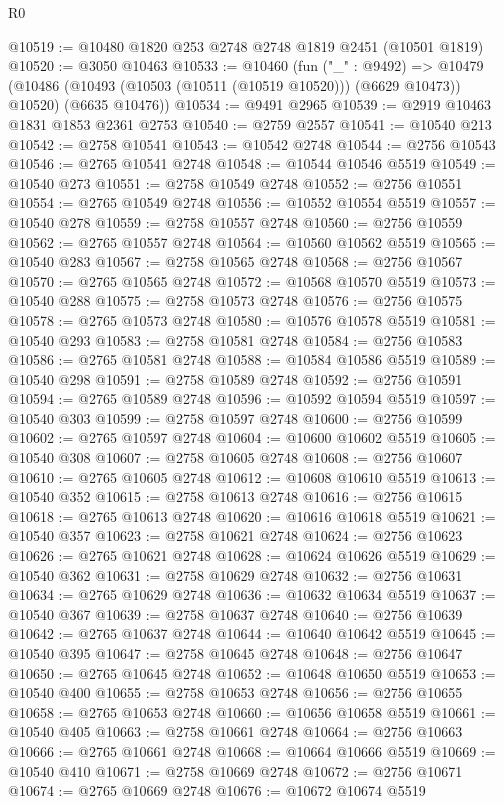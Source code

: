 \begin{lexlean}{R0}
\begin{coremodule}
@10519 := @10480 @1820 @253 @2748 @2748 @1819 @2451 (@10501 @1819)
@10520 := @3050 @10463
@10533 := @10460
    (fun ("_" : @9492) =>
    @10479 (@10486 (@10493 (@10503 (@10511 (@10519 @10520))) (@6629 @10473)) @10520) (@6635 @10476))
@10534 := @9491 @2965
@10539 := @2919 @10463 @1831 @1853 @2361 @2753
@10540 := @2759 @2557
@10541 := @10540 @213
@10542 := @2758 @10541
@10543 := @10542 @2748
@10544 := @2756 @10543
@10546 := @2765 @10541 @2748
@10548 := @10544 @10546 @5519
@10549 := @10540 @273
@10551 := @2758 @10549 @2748
@10552 := @2756 @10551
@10554 := @2765 @10549 @2748
@10556 := @10552 @10554 @5519
@10557 := @10540 @278
@10559 := @2758 @10557 @2748
@10560 := @2756 @10559
@10562 := @2765 @10557 @2748
@10564 := @10560 @10562 @5519
@10565 := @10540 @283
@10567 := @2758 @10565 @2748
@10568 := @2756 @10567
@10570 := @2765 @10565 @2748
@10572 := @10568 @10570 @5519
@10573 := @10540 @288
@10575 := @2758 @10573 @2748
@10576 := @2756 @10575
@10578 := @2765 @10573 @2748
@10580 := @10576 @10578 @5519
@10581 := @10540 @293
@10583 := @2758 @10581 @2748
@10584 := @2756 @10583
@10586 := @2765 @10581 @2748
@10588 := @10584 @10586 @5519
@10589 := @10540 @298
@10591 := @2758 @10589 @2748
@10592 := @2756 @10591
@10594 := @2765 @10589 @2748
@10596 := @10592 @10594 @5519
@10597 := @10540 @303
@10599 := @2758 @10597 @2748
@10600 := @2756 @10599
@10602 := @2765 @10597 @2748
@10604 := @10600 @10602 @5519
@10605 := @10540 @308
@10607 := @2758 @10605 @2748
@10608 := @2756 @10607
@10610 := @2765 @10605 @2748
@10612 := @10608 @10610 @5519
@10613 := @10540 @352
@10615 := @2758 @10613 @2748
@10616 := @2756 @10615
@10618 := @2765 @10613 @2748
@10620 := @10616 @10618 @5519
@10621 := @10540 @357
@10623 := @2758 @10621 @2748
@10624 := @2756 @10623
@10626 := @2765 @10621 @2748
@10628 := @10624 @10626 @5519
@10629 := @10540 @362
@10631 := @2758 @10629 @2748
@10632 := @2756 @10631
@10634 := @2765 @10629 @2748
@10636 := @10632 @10634 @5519
@10637 := @10540 @367
@10639 := @2758 @10637 @2748
@10640 := @2756 @10639
@10642 := @2765 @10637 @2748
@10644 := @10640 @10642 @5519
@10645 := @10540 @395
@10647 := @2758 @10645 @2748
@10648 := @2756 @10647
@10650 := @2765 @10645 @2748
@10652 := @10648 @10650 @5519
@10653 := @10540 @400
@10655 := @2758 @10653 @2748
@10656 := @2756 @10655
@10658 := @2765 @10653 @2748
@10660 := @10656 @10658 @5519
@10661 := @10540 @405
@10663 := @2758 @10661 @2748
@10664 := @2756 @10663
@10666 := @2765 @10661 @2748
@10668 := @10664 @10666 @5519
@10669 := @10540 @410
@10671 := @2758 @10669 @2748
@10672 := @2756 @10671
@10674 := @2765 @10669 @2748
@10676 := @10672 @10674 @5519

\end{coremodule}
\end{lexlean}
